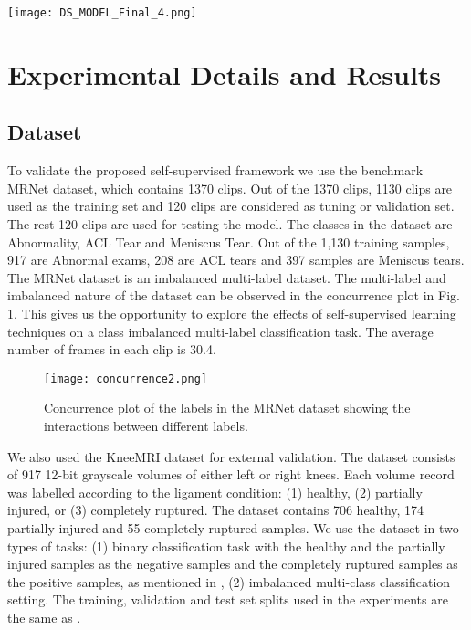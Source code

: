 \documentclass[journal]{IEEEtai}
\begin{document}
\begin{figure*}[ht]
\begin{minipage}{\textwidth}
    \centering
    \texttt{[image: DS\_MODEL\_Final\_4.png]}
    \caption{Network model used for the downstream task. The figure is best visible in 200\% scale.}
    \label{fig:downstream}
\end{minipage}
\end{figure*}

\section{Experimental Details and Results}
\label{sec:exp}

\subsection{Dataset}
\label{subsec:dataset}

To validate the proposed self-supervised framework we use the benchmark MRNet \cite{mrnet} dataset, which contains 1370 clips. Out of the 1370 clips, 1130 clips are used as the training set and 120 clips are considered as tuning or validation set. The rest 120 clips are used for testing the model. The classes in the dataset are Abnormality, ACL Tear and Meniscus Tear. Out of the 1,130 training samples, 917 are Abnormal exams, 208 are ACL tears and 397 samples are Meniscus tears. The MRNet \cite{mrnet} dataset is an imbalanced multi-label dataset. The multi-label and imbalanced nature of the dataset can be observed in the concurrence plot in Fig. \ref{fig:conplot}. This gives us the opportunity to explore the effects of self-supervised learning techniques on a class imbalanced multi-label classification task. The average number of frames in each clip is 30.4. 

\begin{figure}
    \centering
    \texttt{[image: concurrence2.png]}
    \caption{Concurrence plot of the labels in the MRNet dataset showing the interactions between different labels.}
    \label{fig:conplot}
\end{figure}

\indent We also used the KneeMRI \cite{kneemri} dataset for external validation. The dataset consists of 917 12-bit grayscale volumes of either left or right knees. Each volume record was labelled according to the ligament condition: (1) healthy, (2) partially injured, or (3) completely ruptured. The dataset contains 706 healthy, 174 partially injured and 55 completely ruptured samples. We use the dataset in two types of tasks: (1) binary classification task with the healthy and the partially injured samples as the negative samples and the completely ruptured samples as the positive samples, as mentioned in \cite{mrnet}, (2) imbalanced multi-class classification setting. The training, validation and test set splits used in the experiments are the same as \cite{mrnet}. 
\end{document}
